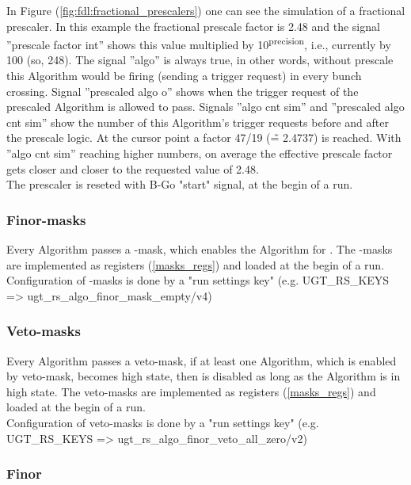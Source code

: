 In Figure (\ref{fig:fdl:fractional_prescalers}) one can see the simulation of a fractional prescaler. In this example the fractional prescale factor is 2.48 and the signal
”prescale factor int” shows this value multiplied by 10\textsuperscript{\tiny{precision}}, i.e., currently by 100 (so, 248).
The signal ”algo” is always true, in other words, without prescale this Algorithm would be firing (sending a trigger request) in every bunch crossing. Signal ”prescaled algo o” shows when the trigger request of the prescaled Algorithm is allowed to pass. Signals ”algo cnt sim” and ”prescaled algo cnt sim” show the number of this Algorithm’s trigger requests before and after the prescale logic. At the cursor point a factor 47/19 (\~{=} 2.4737) is reached. With ”algo cnt sim” reaching higher numbers, on average the effective prescale factor gets closer and closer to the requested value of 2.48.\\
The prescaler is reseted with B-Go "start" signal, at the begin of a run.

\subsubsection{Finor-masks}
\label{sec:fdl:finor_masks}

Every Algorithm passes a \finor-mask, which enables the Algorithm for \finor.
The \finor-masks are implemented as registers (\ref{masks_regs}) and loaded at the begin of a run.\\
Configuration of \finor-masks is done by a "run settings key" (e.g. UGT\_RS\_KEYS => ugt\_rs\_algo\_finor\_mask\_empty/v4)

\subsubsection{Veto-masks}
\label{sec:fdl:veto_masks}

Every Algorithm passes a veto-mask, if at least one Algorithm, which is enabled by veto-mask, becomes high state, then \finor is disabled as long as the Algorithm is in high state.
The veto-masks are implemented as registers (\ref{masks_regs}) and loaded at the begin of a run.\\
Configuration of veto-masks is done by a "run settings key" (e.g. UGT\_RS\_KEYS => ugt\_rs\_algo\_finor\_veto\_all\_zero/v2)

\subsubsection{Finor}
\label{sec:fdl:finor}

